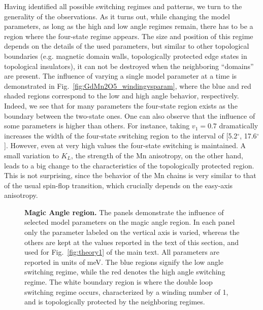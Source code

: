 Having identified all possible switching regimes and patterns, we turn to the generality of the observations. 
As it turns out, while changing the model parameters, as long as the high and low angle regimes remain, there has to be a region where the four-state regime appears. The size and position of this regime depends on the details of the used parameters, but similar to other topological boundaries (e.g. magnetic domain walls, topologically protected edge states in topological insulators), it can not be destroyed when the neighboring ``domains'' are present.
The influence of varying a single model parameter at a time is demonstrated in Fig.~\ref{fig:GdMn2O5_windingvsparam}, where the blue and red shaded regions correspond to the low and high angle behavior, respectively. Indeed, we see that for many parameters the four-state region exists as the boundary between the two-state ones.
One can also observe that the influence of some parameters is higher than others. For instance, taking $v_1=0.7$ dramatically increases the width of the four-state switching region to the interval of [5.2$^\circ$, 17.6$^\circ$]. However, even at very high values the four-state switching is maintained.
A small variation to $K_L$, the strength of the Mn anisotropy, on the other hand, leads to a big change to the characteristics of the topologically protected region.
This is not surprising, since the behavior of the Mn chains is very similar to that of the usual spin-flop transition, which crucially depends on the easy-axis anisotropy.
\begin{figure}[h!]
	\caption{\label{fig:GdMn2O5_windingvsmodelparam} {\bf Magic Angle region.} The panels demonstrate the influence of selected model parameters on the magic angle region. In each panel only the parameter labeled on the vertical axis is varied, whereas the others are kept at the values reported in the text of this section, and used for Fig.~\ref{fig:theory1} of the main text. All parameters are reported in units of meV. The blue regions signify the low angle switching regime, while the red denotes the high angle switching regime. The white boundary region is where the double loop switching regime occurs, characterized by a winding number of 1, and is topologically protected by the neighboring regimes.}
\end{figure}


